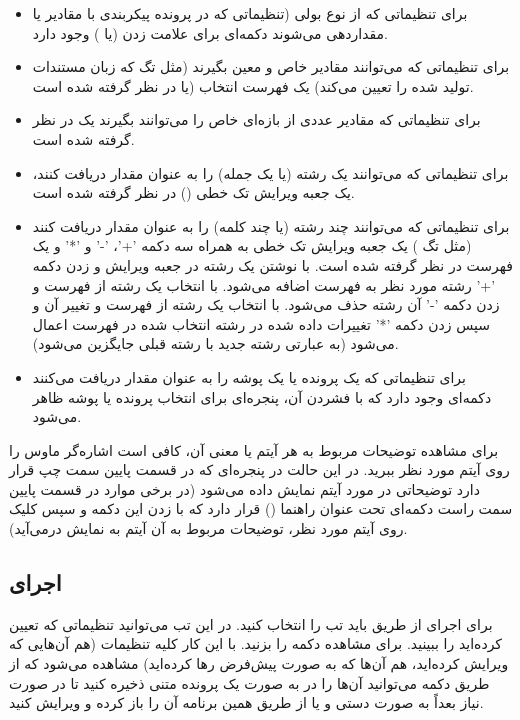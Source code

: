\begin{itemize}
 \item 
برای تنظیماتی که از نوع بولی (تنظیماتی که در پرونده پیکربندی با مقادیر  یا  مقداردهی می‌شوند دکمه‌ای 
برای علامت زدن (یا ) وجود دارد.
\item
برای تنظیماتی که می‌توانند مقادیر خاص و معین بگیرند (مثل تگ  که زبان مستندات تولید شده را 
تعیین می‌کند) یک فهرست انتخاب (یا  در نظر گرفته شده است.
\item
برای تنظیماتی که مقادیر عددی از بازه‌ای خاص را می‌توانند بگیرند یک  در نظر گرفته شده است.
\item
برای تنظیماتی که می‌توانند یک رشته (یا یک جمله) را به عنوان مقدار دریافت کنند، یک جعبه ویرایش تک 
خطی () در نظر گرفته شده است.
\item
برای تنظیماتی که می‌توانند چند رشته (یا چند کلمه) را به عنوان مقدار دریافت کنند (مثل تگ ) یک 
جعبه ویرایش تک خطی به همراه سه دکمه '+'، '-' و '*' و یک فهرست در نظر گرفته شده است. با نوشتن یک رشته در جعبه 
ویرایش و زدن دکمه '+' رشته مورد نظر به فهرست اضافه می‌شود. با انتخاب یک رشته از فهرست و زدن دکمه '-' آن رشته 
حذف می‌شود. با انتخاب یک رشته از فهرست و تغییر آن و سپس زدن دکمه '*' تغییرات داده شده در رشته انتخاب شده در فهرست 
اعمال می‌شود (به عبارتی رشته جدید با رشته قبلی جایگزین می‌شود).
\item
برای تنظیماتی که یک پرونده یا یک پوشه را به عنوان مقدار دریافت می‌کنند دکمه‌ای وجود دارد که با فشردن آن، پنجره‌ای 
برای انتخاب پرونده یا پوشه ظاهر می‌شود.
\end{itemize}

برای مشاهده توضیحات مربوط به هر آیتم یا معنی آن، کافی است اشاره‌گر ماوس را روی
آیتم مورد نظر ببرید. در این حالت در پنجره‌ای که در قسمت پایین سمت چپ قرار دارد
توضیحاتی در مورد آیتم نمایش داده می‌شود (در برخی موارد در قسمت پایین سمت راست
دکمه‌ای تحت عنوان راهنما () قرار دارد که با زدن این دکمه و سپس کلیک روی
آیتم مورد نظر، توضیحات مربوط به آن آیتم به نمایش درمی‌آید).

\subsection{اجرای }

برای اجرای  از طریق  باید تب  را انتخاب کنید.
در این تب می‌توانید تنظیماتی که تعیین کرده‌اید را ببینید. برای مشاهده دکمه
 را بزنید. با این کار کلیه تنظیمات (هم آن‌هایی که ویرایش
کرده‌اید، هم آن‌ها که به صورت پیش‌فرض رها کرده‌اید) مشاهده می‌شود که از طریق
دکمه  می‌توانید آن‌ها را در به صورت یک پرونده متنی ذخیره کنید تا در
صورت نیاز بعداً به صورت دستی و یا از طریق همین برنامه  آن را باز
کرده و ویرایش کنید.

